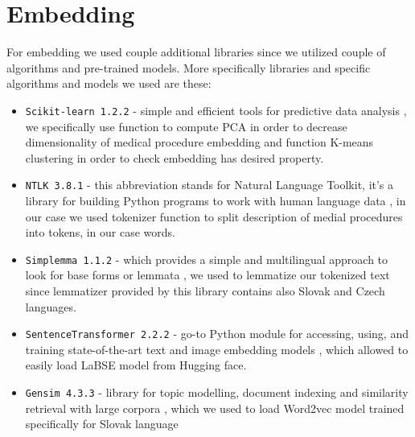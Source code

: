 
\section{Embedding}
\label{embedDesign}

For embedding we used couple additional libraries since we utilized couple of algorithms and pre-trained models. More specifically libraries and specific algorithms and models we used are these: 
\\

\begin{itemize}
	\item \texttt{Scikit-learn 1.2.2} - simple and efficient tools for predictive data analysis \cite{scikitlearn},  we specifically use function to compute PCA in order to decrease dimensionality of medical procedure embedding and function K-means clustering in order to check embedding has desired property.
	
	\item \texttt{NTLK 3.8.1} - this abbreviation stands for Natural Language Toolkit, it's a library for building Python programs to work with human language data \cite{ntlk}, in our case we used tokenizer function to split description of medial procedures into tokens, in our case words. 
	
	\item \texttt{Simplemma 1.1.2} - which provides a simple and multilingual approach to look for base forms or lemmata \cite{simplemma}, we used to lemmatize our tokenized text since lemmatizer provided by this library contains also Slovak and Czech languages.  
	
	\item \texttt{SentenceTransformer 2.2.2} - go-to Python module for accessing, using, and training state-of-the-art text and image embedding models \cite{sentence_transformer}, which allowed to easily load LaBSE model from Hugging face.
	
	\item \texttt{Gensim 4.3.3} - library for topic modelling, document indexing and similarity retrieval with large corpora \cite{gensim}, which we used to load Word2vec model trained specifically for Slovak language
\end{itemize}


